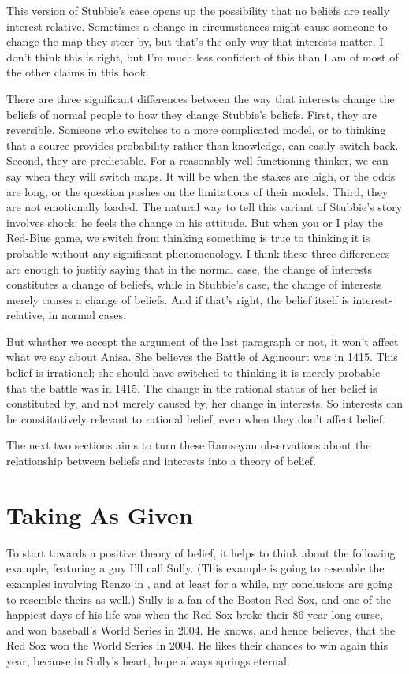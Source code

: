 \documentclass[
  11pt,
]{book}
\begin{document}
This version of Stubbie's case opens up the possibility that no beliefs are really interest-relative. Sometimes a change in circumstances might cause someone to change the map they steer by, but that's the only way that interests matter. I don't think this is right, but I'm much less confident of this than I am of most of the other claims in this book.

There are three significant differences between the way that interests change the beliefs of normal people to how they change Stubbie's beliefs. First, they are reversible. Someone who switches to a more complicated model, or to thinking that a source provides probability rather than knowledge, can easily switch back. Second, they are predictable. For a reasonably well-functioning thinker, we can say when they will switch maps. It will be when the stakes are high, or the odds are long, or the question pushes on the limitations of their models. Third, they are not emotionally loaded. The natural way to tell this variant of Stubbie's story involves shock; he feels the change in his attitude. But when you or I play the Red-Blue game, we switch from thinking something is true to thinking it is probable without any significant phenomenology. I think these three differences are enough to justify saying that in the normal case, the change of interests constitutes a change of beliefs, while in Stubbie's case, the change of interests merely causes a change of beliefs. And if that's right, the belief itself is interest-relative, in normal cases.

But whether we accept the argument of the last paragraph or not, it won't affect what we say about Anisa. She believes the Battle of Agincourt was in 1415. This belief is irrational; she should have switched to thinking it is merely probable that the battle was in 1415. The change in the rational status of her belief is constituted by, and not merely caused by, her change in interests. So interests can be constitutively relevant to rational belief, even when they don't affect belief.

The next two sections aims to turn these Ramseyan observations about the relationship between beliefs and interests into a theory of belief.

\hypertarget{given}{%
\section{Taking As Given}\label{given}}

To start towards a positive theory of belief, it helps to think about the following example, featuring a guy I'll call Sully. (This example is going to resemble the examples involving Renzo in \citet{RossSchroeder2014}, and at least for a while, my conclusions are going to resemble theirs as well.) Sully is a fan of the Boston Red Sox, and one of the happiest days of his life was when the Red Sox broke their 86 year long curse, and won baseball's World Series in 2004. He knows, and hence believes, that the Red Sox won the World Series in 2004. He likes their chances to win again this year, because in Sully's heart, hope always springs eternal.
\end{document}
